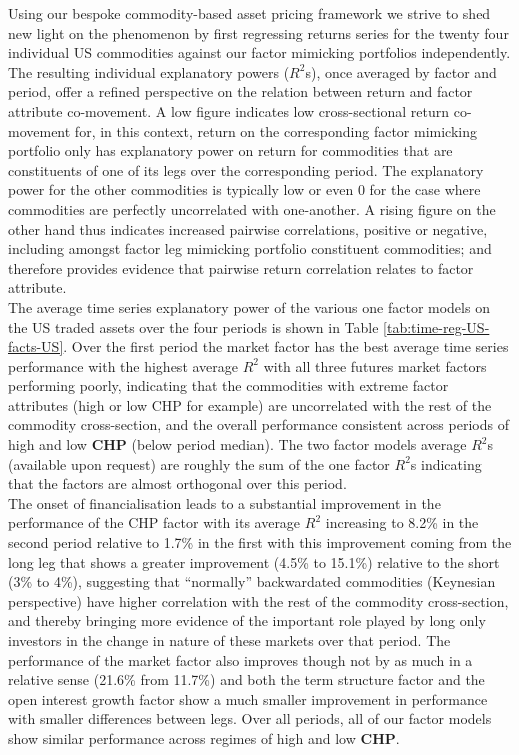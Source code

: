 \documentclass[]{elsarticle} %
\begin{document}
\bigskip\bigskip\setlength{\parindent}{0pt}

Using our bespoke commodity-based asset pricing framework we strive to shed new light on the phenomenon by first regressing returns series for the twenty four individual US commodities against our factor mimicking portfolios independently. The resulting individual explanatory powers (\(R^2\)s), once averaged by factor and period, offer a refined perspective on the relation between return and factor attribute co-movement. A low figure indicates low cross-sectional return co-movement for, in this context, return on the corresponding factor mimicking portfolio only has explanatory power on return for commodities that are constituents of one of its legs over the corresponding period. The explanatory power for the other commodities is typically low or even 0 for the case where commodities are perfectly uncorrelated with one-another. A rising figure on the other hand thus indicates increased pairwise correlations, positive or negative, including amongst factor leg mimicking portfolio constituent commodities; and therefore provides evidence that pairwise return correlation relates to factor attribute.\\
The average time series explanatory power of the various one factor models on the US traded assets over the four periods is shown in Table \ref{tab:time-reg-US-facts-US}. Over the first period the market factor has the best average time series performance with the highest average \(R^{2}\) with all three futures market factors performing poorly, indicating that the commodities with extreme factor attributes (high or low CHP for example) are uncorrelated with the rest of the commodity cross-section, and the overall performance consistent across periods of high and low \textbf{CHP} (below period median). The two factor models average \(R^{2}\)s (available upon request) are roughly the sum of the one factor \(R^{2}\)s indicating that the factors are almost orthogonal over this period.\\
The onset of financialisation leads to a substantial improvement in the performance of the CHP factor with its average \(R^{2}\) increasing to 8.2\% in the second period relative to 1.7\% in the first with this improvement coming from the long leg that shows a greater improvement (4.5\% to 15.1\%) relative to the short (3\% to 4\%), suggesting that ``normally'' backwardated commodities (Keynesian perspective) have higher correlation with the rest of the commodity cross-section, and thereby bringing more evidence of the important role played by long only investors in the change in nature of these markets over that period. The performance of the market factor also improves though not by as much in a relative sense (21.6\% from 11.7\%) and both the term structure factor and the open interest growth factor show a much smaller improvement in performance with smaller differences between legs. Over all periods, all of our factor models show similar performance across regimes of high and low \textbf{CHP}.
\end{document}
